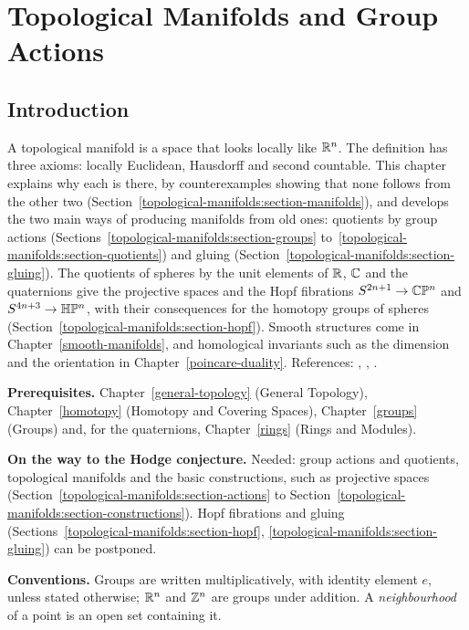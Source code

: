 \chapter{Topological Manifolds and Group Actions}\label{topological-manifolds}

\section{Introduction}\label{topological-manifolds:section-introduction}

A topological manifold is a space that looks locally like $\mathbb{R}^n$. The definition has three axioms: locally Euclidean, Hausdorff and second countable. This chapter explains why each is there, by
counterexamples showing that none follows from the other two (Section~\ref{topological-manifolds:section-manifolds}), and develops the two main ways of producing manifolds from old ones: quotients by
group actions (Sections~\ref{topological-manifolds:section-groups} to~\ref{topological-manifolds:section-quotients}) and gluing (Section~\ref{topological-manifolds:section-gluing}). The quotients of spheres by the
unit elements of $\mathbb{R}$, $\mathbb{C}$ and the quaternions give the projective spaces and the Hopf fibrations $S^{2n+1} \to \mathbb{C}\mathbb{P}^n$ and $S^{4n+3} \to \mathbb{H}\mathbb{P}^n$, with their consequences for the homotopy groups of
spheres (Section~\ref{topological-manifolds:section-hopf}). Smooth structures come in
Chapter~\ref{smooth-manifolds}, and homological invariants such as the dimension and the orientation in Chapter~\ref{poincare-duality}. References: \cite{munkres-topology}, \cite{hatcher-at},
\cite{lee-smooth-manifolds}.

\noindent\textbf{Prerequisites.} Chapter~\ref{general-topology} (General Topology), Chapter~\ref{homotopy} (Homotopy and Covering Spaces), Chapter~\ref{groups} (Groups) and, for the quaternions,
Chapter~\ref{rings} (Rings and Modules).

\noindent\textbf{On the way to the Hodge conjecture.} Needed: group actions and quotients, topological manifolds and the basic constructions, such as projective spaces (Section~\ref{topological-manifolds:section-actions} to
Section~\ref{topological-manifolds:section-constructions}). Hopf fibrations and gluing (Sections~\ref{topological-manifolds:section-hopf}, \ref{topological-manifolds:section-gluing}) can be postponed.

\noindent\textbf{Conventions.} Groups are written multiplicatively, with identity element $e$, unless stated otherwise; $\mathbb{R}^n$ and $\mathbb{Z}^n$ are groups under addition. A \emph{neighbourhood} of a point is an open set
containing it.

